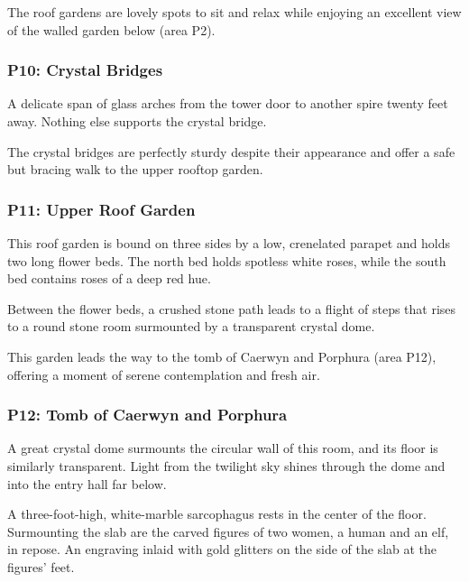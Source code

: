 \documentclass[10pt,a4paper,twoside,bg=print,twocolumn,openany,nodeprecatedcode]{dndbook}
\begin{document}
The roof gardens are lovely spots to sit and relax while enjoying an excellent view of the walled garden below (area P2).

\subsubsection{P10: Crystal Bridges}
\begin{DndReadAloud}{}
A delicate span of glass arches from the tower door to another spire twenty feet away. Nothing else supports the crystal bridge.

\end{DndReadAloud}

The crystal bridges are perfectly sturdy despite their appearance and offer a safe but bracing walk to the upper rooftop garden.

\subsubsection{P11: Upper Roof Garden}
\begin{DndReadAloud}{}
This roof garden is bound on three sides by a low, crenelated parapet and holds two long flower beds. The north bed holds spotless white roses, while the south bed contains roses of a deep red hue.

Between the flower beds, a crushed stone path leads to a flight of steps that rises to a round stone room surmounted by a transparent crystal dome.

\end{DndReadAloud}

This garden leads the way to the tomb of Caerwyn and Porphura (area P12), offering a moment of serene contemplation and fresh air.

\subsubsection{P12: Tomb of Caerwyn and Porphura}
\begin{DndReadAloud}{}
A great crystal dome surmounts the circular wall of this room, and its floor is similarly transparent. Light from the twilight sky shines through the dome and into the entry hall far below.

A three-foot-high, white-marble sarcophagus rests in the center of the floor. Surmounting the slab are the carved figures of two women, a human and an elf, in repose. An engraving inlaid with gold glitters on the side of the slab at the figures' feet.

\end{DndReadAloud}
\end{document}
